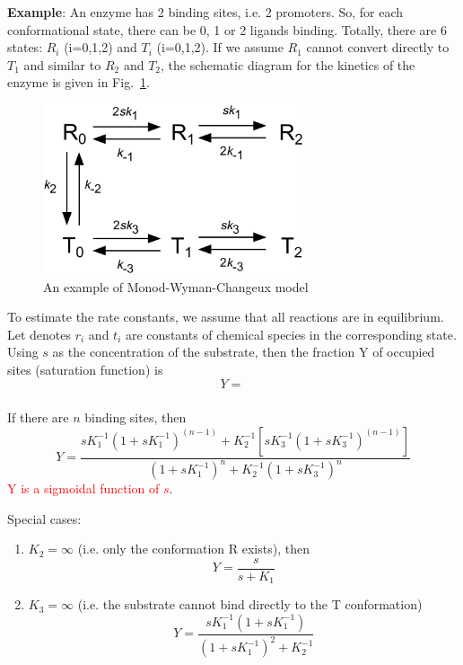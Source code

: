 {\bf Example}: An enzyme has 2 binding sites, i.e. 2 promoters. So,
for each conformational state, there can be 0, 1 or 2 ligands
binding. Totally, there are 6 states: $R_i$ (i=0,1,2) and $T_i$
(i=0,1,2). If we assume $R_1$ cannot convert directly to $T_1$ and
similar to $R_2$ and $T_2$, the schematic diagram for the kinetics of
the enzyme is given in Fig.~\ref{fig:MWC_model}.

\begin{figure}[hbt]
  \centerline{\includegraphics[height=5cm,
    angle=0]{./images/MWC_model.eps}}
\caption{An example of Monod-Wyman-Changeux model}
\label{fig:MWC_model}
\end{figure}
To estimate the rate constants, we assume that all reactions are in
equilibrium. Let denotes $r_i$ and $t_i$ are constants of chemical
species in the corresponding state. Using $s$ as the concentration of
the substrate, then the fraction Y of occupied sites (saturation
function) is
\begin{equation}
  \label{eq:1386}
  Y = \frac{}{}
\end{equation}

If there are $n$ binding sites, then 
\begin{equation}
  \label{eq:1387}
  Y = \frac{sK_1^{-1}(1+sK_1^{-1})^{(n-1)} + K_2^{-1}
  \left[  sK_3^{-1}(1+sK_3^{-1})^{(n-1)}\right]}{(1+sK_1^{-1})^n+K_2^{-1}(1+sK_3^{-1})^n}
\end{equation}
\textcolor{red}{Y is a sigmoidal function of $s$}.

Special cases:
\begin{enumerate}
\item $K_2=\infty$ (i.e. only the conformation R exists), then
  \begin{equation}
    \label{eq:1388}
    Y = \frac{s}{s+K_1}
  \end{equation}
\item $K_3=\infty$ (i.e. the substrate cannot bind directly to the T
  conformation)
  \begin{equation}
    \label{eq:1389}
    Y = \frac{sK_1^{-1}(1+sK_1^{-1})}{(1+sK_1^{-1})^2+K_2^{-1}}
  \end{equation}
\end{enumerate}





